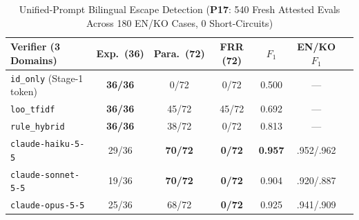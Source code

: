\begin{table}[!tbp]
\caption{Unified-Prompt Bilingual Escape Detection (\textbf{P17}: 540 Fresh Attested Evals Across 180 EN/KO Cases, 0 Short-Circuits)}
\label{tab:phase5-aamas-escape}
\centering
\scriptsize
\setlength{\tabcolsep}{2.5pt}
\begin{tabularx}{\columnwidth}{@{}lcccccc@{}}
\toprule
\textbf{Verifier (3 Domains)} & \textbf{Exp.\ (36)} & \textbf{Para.\ (72)} & \textbf{FRR (72)} & \textbf{$F_1$} & \textbf{EN/KO $F_1$} \\
\midrule
\texttt{id\_only} (Stage-1 token) & \textbf{36/36} & 0/72 & 0/72 & 0.500 & --- \\
\texttt{loo\_tfidf} & \textbf{36/36} & 45/72 & 45/72 & 0.692 & --- \\
\texttt{rule\_hybrid} & \textbf{36/36} & 38/72 & 0/72 & 0.813 & --- \\
\texttt{claude-haiku-5-5} & 29/36 & \textbf{70/72} & \textbf{0/72} & \textbf{0.957} & .952/.962 \\
\texttt{claude-sonnet-5-5} & 19/36 & \textbf{70/72} & \textbf{0/72} & 0.904 & .920/.887 \\
\texttt{claude-opus-5-5} & 25/36 & 68/72 & \textbf{0/72} & 0.925 & .941/.909 \\
\bottomrule
\end{tabularx}
\end{table}
